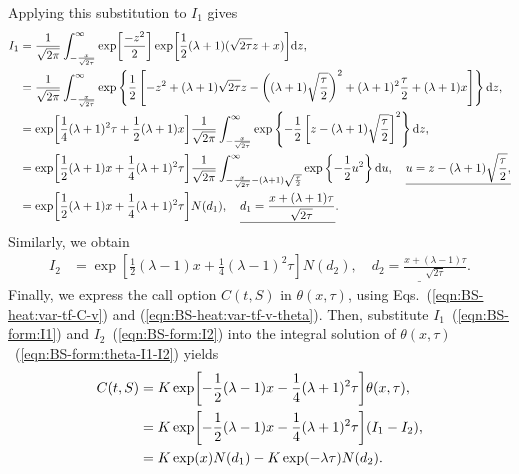 \documentclass{book}
\begin{document}
Applying this substitution to $I_1$ gives
\begin{align}
    I_1 &= \frac{1}{\sqrt{2\pi}}\int_{-\frac{x}{\sqrt{2\tau}}}^\infty 
    \exp[\frac{-z^2}{2}]
    \exp[\frac{1}{2}(\lambda + 1) (\sqrt{2\tau} z + x)]
    \dd z, \notag\\
    &= \frac{1}{\sqrt{2\pi}}\int_{-\frac{x}{\sqrt{2\tau}}}^\infty 
    \exp\left\{\frac{1}{2} 
    \left[-z^2 + (\lambda + 1) \sqrt{2\tau} z - \left((\lambda + 1)\sqrt{\frac{\tau}{2}}\right)^2 
    + (\lambda + 1)^2\frac{\tau}{2} + (\lambda + 1) x\right]
    \right\}\dd z, \notag\\
    &= 
    \exp[\frac{1}{4}(\lambda + 1)^2 \tau + \frac{1}{2} (\lambda + 1) x]
    \frac{1}{\sqrt{2\pi}}
    \int_{-\frac{x}{\sqrt{2\tau}}}^\infty 
    \exp\left\{
     -\frac{1}{2}\left[ z - (\lambda + 1)\sqrt{\frac{\tau}{2}}\right]^2 
    \right\}\dd z, \notag\\
    &= 
    \exp[\frac{1}{2} (\lambda + 1) x + \frac{1}{4}(\lambda + 1)^2 \tau]
    \frac{1}{\sqrt{2\pi}}
    \int_{-\frac{x}{\sqrt{2\tau}} - (\lambda + 1)\sqrt{\frac{\tau}{2}}}^\infty 
    \exp\left\{
     -\frac{1}{2}u ^2 
    \right\}\dd u, \quad \underline{u = z - (\lambda + 1)\sqrt{\frac{\tau}{2}},}\notag\\
    &= 
    \exp[\frac{1}{2} (\lambda + 1) x + \frac{1}{4}(\lambda + 1)^2 \tau]
    N(d_1),
    \quad \underline{d_1 = \frac{x + (\lambda + 1) \tau}{\sqrt{2\tau}}}.
    \label{eqn:BS-form:I1}
\end{align}
Similarly, we obtain
\begin{align}
    I_2 &= \exp[\frac{1}{2} (\lambda - 1) x + \frac{1}{4}(\lambda - 1)^2 \tau]
    N(d_2),
    \quad \underline{d_2 = \frac{x + (\lambda - 1) \tau}{\sqrt{2\tau}}}.
    \label{eqn:BS-form:I2}
\end{align}
Finally, we express the call option $C(t,S)$ in $\theta(x,\tau)$, using Eqs.~(\ref{eqn:BS-heat:var-tf-C-v}) and (\ref{eqn:BS-heat:var-tf-v-theta}). 
Then, substitute $I_1$~(\ref{eqn:BS-form:I1}) and $I_2$~(\ref{eqn:BS-form:I2}) into the integral solution of $\theta(x,\tau)$~(\ref{eqn:BS-form:theta-I1-I2}) yields
\begin{align}
    C(t,S) 
    &= K \exp[-\frac{1}{2} (\lambda - 1) x  -\frac{1}{4} (\lambda + 1)^2 \tau] \theta(x, \tau), \notag\\
    &= K \exp[-\frac{1}{2} (\lambda - 1) x -\frac{1}{4} (\lambda + 1)^2 \tau] (I_1 - I_2), \notag\\
    &= K \exp(x) N(d_1) - K \exp(-\lambda \tau) N(d_2). \notag
\end{align}
\end{document}
